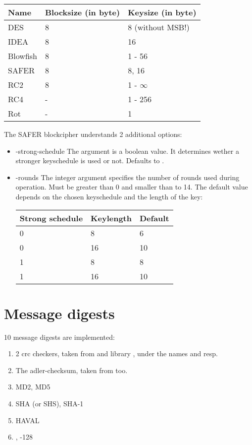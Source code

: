 \documentclass {report}
\begin{document}
\begin {center}
	\begin {tabular}{|l|l|l|}\hline
	Name		& Blocksize (in byte)	& Keysize (in byte) \\ \hline\hline
	DES		& 8			& 8 (without MSB!) \\ \hline
	IDEA		& 8			& 16 \\ \hline
	Blowfish	& 8			& 1 - 56 \\ \hline
	SAFER		& 8			& 8, 16 \\ \hline
	RC2		& 8			& 1 - $\infty$ \\ \hline\hline
	RC4		& -			& 1 - 256 \\ \hline
	Rot		& -			& 1	\\ \hline
	\end   {tabular}
\end   {center}

The SAFER blockcipher understands 2 additional options:

\begin {itemize}
\item [-strong-schedule]
	The argument is a boolean value. It determines wether a
	stronger keyschedule is used or not. Defaults to .

\item [-rounds]
	The integer argument specifies the number of rounds used
	during operation. Must be greater than 0 and smaller than to
	14. The default value depends on the chosen keyschedule and
	the length of the key:

	\begin {tabular} {l|l|l|}\hline
	Strong schedule & Keylength & Default	\\ \hline\hline
	0		&  8	    &	 6	\\ \hline
	0		& 16	    &	10	\\ \hline
	1		&  8	    &	 8	\\ \hline
	1		& 16	    &	10	\\ \hline
	\end  {tabular}
\end   {itemize}

\section {Message digests}

10 message digests are implemented:

\begin {enumerate}
\item	2 crc checkers, taken from \PGP{} and library \zlib, under
	the names  and  resp.
\item	The adler-checksum, taken from \zlib{} too.
\item	MD2, MD5
\item	SHA (or SHS), SHA-1
\item	HAVAL
\item	\rmd, -128
\end   {enumerate}
\end{document}
